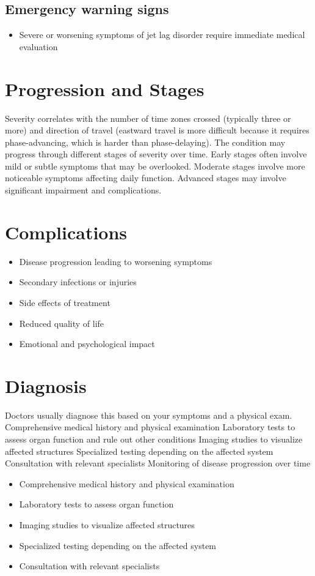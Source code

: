 \subsection{Emergency warning signs}
\begin{itemize}[noitemsep]
  \item Severe or worsening symptoms of jet lag disorder require immediate medical evaluation
\end{itemize}
\section{Progression and Stages}
Severity correlates with the number of time zones crossed (typically three or more) and direction of travel (eastward travel is more difficult because it requires phase-advancing, which is harder than phase-delaying). The condition may progress through different stages of severity over time. Early stages often involve mild or subtle symptoms that may be overlooked. Moderate stages involve more noticeable symptoms affecting daily function. Advanced stages may involve significant impairment and complications.
\section{Complications}
\begin{itemize}[noitemsep]
  \item Disease progression leading to worsening symptoms
  \item Secondary infections or injuries
  \item Side effects of treatment
  \item Reduced quality of life
  \item Emotional and psychological impact
\end{itemize}
\section{Diagnosis}
Doctors usually diagnose this based on your symptoms and a physical exam. Comprehensive medical history and physical examination Laboratory tests to assess organ function and rule out other conditions Imaging studies to visualize affected structures Specialized testing depending on the affected system Consultation with relevant specialists Monitoring of disease progression over time

\begin{itemize}[noitemsep]
  \item Comprehensive medical history and physical examination
  \item Laboratory tests to assess organ function
  \item Imaging studies to visualize affected structures
  \item Specialized testing depending on the affected system
  \item Consultation with relevant specialists
\end{itemize}
